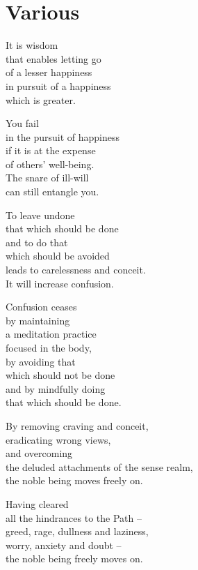 
\chapter{Various}


It is wisdom\\
that enables letting go\\
of a lesser happiness\\
in pursuit of a happiness\\
which is greater.


You fail\\
in the pursuit of happiness\\
if it is at the expense\\
of others' well-being.\\
The snare of ill-will\\
can still entangle you.


To leave undone\\
that which should be done\\
and to do that\\
which should be avoided\\
leads to carelessness and conceit.\\
It will increase confusion.


Confusion ceases\\
by maintaining\\
a meditation practice\\
focused in the body,\\
by avoiding that\\
which should not be done\\
and by mindfully doing\\
that which should be done.


By removing craving and conceit,\\
eradicating wrong views,\\
and overcoming\\
the deluded attachments of the sense realm,\\
the noble being moves freely on.


Having cleared\\
all the hindrances to the Path --\\
greed, rage, dullness and laziness,\\
worry, anxiety and doubt --\\
the noble being freely moves on.


